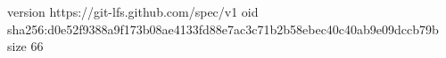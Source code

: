 version https://git-lfs.github.com/spec/v1
oid sha256:d0e52f9388a9f173b08ae4133fd88e7ac3c71b2b58ebec40c40ab9e09dccb79b
size 66
